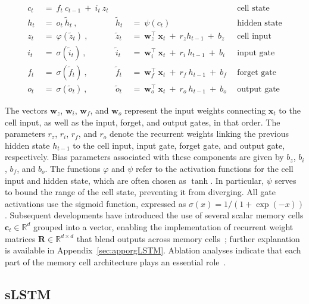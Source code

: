 \begin{align}
c_t \ &= \  f_t \ c_{t-1} \ + \ i_t \ z_t &  & &\text{cell state} \\
h_t  \ &= \ o_t \ \tilde{h}_t \ , & \tilde{h}_t \ &= \ \psi \left( c_t\right)
  &\text{hidden state} \\
z_t \ &= \ \varphi \left( \tilde{z}_t \right) \ , 
  &\tilde{z}_t \ &=  \ \mathbf{w}^\top_{z} \ \mathbf{x}_t \ + \
  r_{z}  h_{t-1} \ + \  b_{z} \ \
  &\text{cell input} \\
i_t \ &= \ \sigma \left( \tilde{i}_t  \right) \ , 
  &\tilde{i}_t \ &= \ \mathbf{w}^\top_{i} \ \mathbf{x}_t \ + \
  r_{i}  \ h_{t-1} \ + \  b_{i} \ \
  &\text{input gate} \\
f_t \ &= \ \sigma \left(  \tilde{f}_t \right) \ , 
  &\tilde{f}_t \ &= \ \mathbf{w}^\top_{f} \ \mathbf{x}_t  \ + \
  r_{f}  \ h_{t-1} \ + \  b_{f} \ \
  &\text{forget gate} \\
o_t \ &= \ \sigma \left( \tilde{o}_t \right) \ , 
  &\tilde{o}_t  \ &= \ \mathbf{w}^\top_{o} \ \mathbf{x}_t \ + \
  r_{o}  \ h_{t-1} \ + \  b_{o} \ \
  &\text{output gate} 
\end{align}

The vectors $\mathbf{w}_{z}$, $\mathbf{w}_{i}$, $\mathbf{w}_{f}$, and $\mathbf{w}_{o}$ represent the input weights connecting $\mathbf{x}_t$ to the cell input, as well as the input, forget, and output gates, in that order. The parameters $r_{z}$, $r_{i}$, $r_{f}$, and $r_{o}$ denote the recurrent weights linking the previous hidden state $h_{t-1}$ to the cell input, input gate, forget gate, and output gate, respectively. Bias parameters associated with these components are given by $b_{z}$, $b_{i}$, $b_{f}$, and $b_{o}$. The functions $\varphi$ and $\psi$ refer to the activation functions for the cell input and hidden state, which are often chosen as $\tanh$. In particular, $\psi$ serves to bound the range of the cell state, preventing it from diverging. All gate activations use the sigmoid function, expressed as $\sigma \left( x \right)= 1/(1+\exp(-x))$. Subsequent developments have introduced the use of several scalar memory cells $\mathbf{c}_t \in \mathbb{R}^{d}$ grouped into a vector, enabling the implementation of recurrent weight matrices $\mathbf{R} \in \mathbb{R}^{d \times d}$ that blend outputs across memory cells~\citep{Greff:15}; further explanation is available in Appendix~\ref{sec:apporgLSTM}. Ablation analyses indicate that each part of the memory cell architecture plays an essential role~\citep{Greff:15}.

\subsection{sLSTM}
\label{sec:sLSTM}

